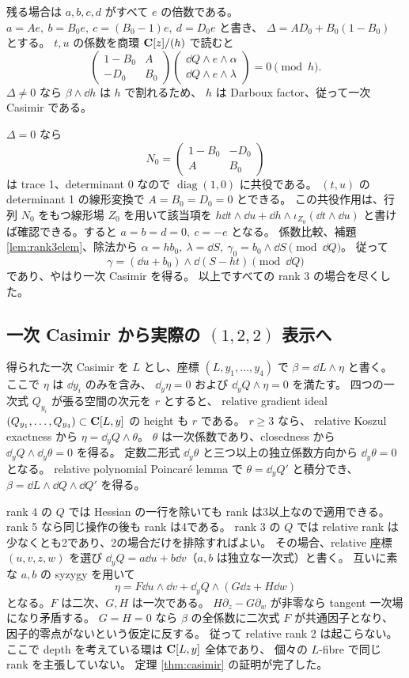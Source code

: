 \documentclass[11pt,a4paper]{ltjsarticle}
\DeclareMathOperator{\diag}{diag}
\theoremstyle{remark}\newtheorem{remark}[theorem]{注意}\renewcommand{\proofname}{証明}
\begin{document}
残る場合は $a,b,c,d$ がすべて $e$ の倍数である。
$a=Ae,\ b=B_0e,\ c=(B_0-1)e,\ d=D_0e$ と書き、
$\Delta=AD_0+B_0(1-B_0)$ とする。
$t,u$ の係数を商環 $\mathbf C[z]/(h)$ で読むと
\[
 \begin{pmatrix}1-B_0&A\\-D_0&B_0\end{pmatrix}
 \begin{pmatrix}\dd Q\wedge e\wedge\alpha\\
                 \dd Q\wedge e\wedge\lambda\end{pmatrix}=0\pmod h.
\]
$\Delta\ne0$ なら $\beta\wedge\dd h$ は $h$ で割れるため、
$h$ は Darboux factor、従って一次 Casimir である。

$\Delta=0$ なら
\[
 N_0=\begin{pmatrix}1-B_0&-D_0\\ A&B_0\end{pmatrix}
\]
は trace 1、determinant 0 なので $\diag(1,0)$ に共役である。
$(t,u)$ の determinant 1 の線形変換で $A=B_0=D_0=0$ とできる。
この共役作用は、行列 $N_0$ をもつ線形場 $Z_0$ を用いて該当項を
$h\dd t\wedge\dd u+\dd h\wedge\iota_{Z_0}(\dd t\wedge\dd u)$
と書けば確認できる。すると $a=b=d=0,\ c=-e$ となる。
係数比較、補題 \ref{lem:rank3elem}、除法から
$\alpha=h b_0,\ \lambda=\dd S,\ \gamma_0=b_0\wedge\dd S\pmod{\dd Q}$。
従って
\[
 \gamma=(\dd u+b_0)\wedge\dd(S-ht)\pmod{\dd Q}
\]
であり、やはり一次 Casimir を得る。
以上ですべての rank 3 の場合を尽くした。

\subsection{一次 Casimir から実際の \texorpdfstring{$(1,2,2)$}{(1,2,2)} 表示へ}
得られた一次 Casimir を $L$ とし、座標 $(L,y_1,\ldots,y_4)$ で
$\beta=\dd L\wedge\eta$ と書く。
ここで $\eta$ は $\dd y_i$ のみを含み、
$\dd_y\eta=0$ および $\dd_yQ\wedge\eta=0$ を満たす。
四つの一次式 $Q_{y_i}$ が張る空間の次元を $r$ とすると、
relative gradient ideal
$(Q_{y_1},\ldots,Q_{y_4})\subset\mathbf C[L,y]$ の height も $r$ である。
$r\ge3$ なら、
relative Koszul exactness から $\eta=\dd_yQ\wedge\theta$。
$\theta$ は一次係数であり、closedness から
$\dd_yQ\wedge\dd_y\theta=0$ を得る。
定数二形式 $\dd_y\theta$ と三つ以上の独立係数方向から
$\dd_y\theta=0$ となる。
relative polynomial Poincaré lemma で $\theta=\dd_yQ'$ と積分でき、
$\beta=\dd L\wedge\dd Q\wedge\dd Q'$ を得る。

rank 4 の $Q$ では Hessian の一行を除いても rank は3以上なので適用できる。
rank 5 なら同じ操作の後も rank は4である。
rank 3 の $Q$ では relative rank は少なくとも2であり、2の場合だけを排除すればよい。
その場合、relative 座標 $(u,v,z,w)$ を選び
$\dd_yQ=a\dd u+b\dd v$（$a,b$ は独立な一次式）と書く。
互いに素な $a,b$ の syzygy を用いて
\[
 \eta=F\dd u\wedge\dd v+
       \dd_yQ\wedge(G\dd z+H\dd w)
\]
となる。$F$ は二次、$G,H$ は一次である。
$H\partial_z-G\partial_w$ が非零なら tangent 一次場になり矛盾する。
$G=H=0$ なら $\beta$ の全係数に二次式 $F$ が共通因子となり、
因子的零点がないという仮定に反する。
従って relative rank 2 は起こらない。
ここで depth を考えている環は $\mathbf C[L,y]$ 全体であり、
個々の $L$-fibre で同じ rank を主張していない。
定理 \ref{thm:casimir} の証明が完了した。
\end{document}
